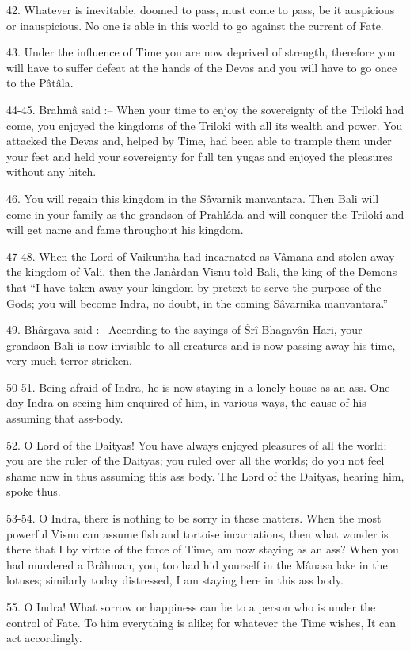 42. Whatever is inevitable, doomed to pass, must come to pass, be it auspicious or inauspicious. No one is able in this world to go against the current of Fate.

43. Under the influence of Time you are now deprived of strength, therefore you will have to suffer defeat at the hands of the Devas and you will have to go once to the P\^at\^ala.

44-45. Brahm\^a said :-- When your time to enjoy the sovereignty of the Trilok\^i had come, you enjoyed the kingdoms of the Trilok\^i with all its wealth and power. You attacked the Devas and, helped by Time, had been able to trample them under your feet and held your sovereignty for full ten yugas and enjoyed the pleasures without any hitch.

46. You will regain this kingdom in the S\^avarnik manvantara. Then Bali will come in your family as the grandson of Prahl\^ada and will conquer the Trilok\^i and will get name and fame throughout his kingdom.

47-48. When the Lord of Vaikuntha had incarnated as V\^amana and stolen away the kingdom of Vali, then the Jan\^ardan Visnu told Bali, the king of the Demons that ``I have taken away your kingdom by pretext to serve the purpose of the Gods; you will become Indra, no doubt, in the coming S\^avarnika manvantara.''

49. Bh\^argava said :-- According to the sayings of \'Sr\^i Bhagav\^an Hari, your grandson Bali is now invisible to all creatures and is now passing away his time, very much terror stricken.

50-51. Being afraid of Indra, he is now staying in a lonely house as an ass. One day Indra on seeing him enquired of him, in various ways, the cause of his assuming that ass-body.

52. O Lord of the Daityas! You have always enjoyed pleasures of all the world; you are the ruler of the Daityas; you ruled over all the worlds; do you not feel shame now in thus assuming this ass body. The Lord of the Daityas, hearing him, spoke thus.

53-54. O Indra, there is nothing to be sorry in these matters. When the most powerful Visnu can assume fish and tortoise incarnations, then what wonder is there that I by virtue of the force of Time, am now staying as an ass? When you had murdered a Br\^ahman, you, too had hid yourself in the M\^anasa lake in the lotuses; similarly today distressed, I am staying here in this ass body.

55. O Indra! What sorrow or happiness can be to a person who is under the control of Fate. To him everything is alike; for whatever the Time wishes, It can act accordingly.

